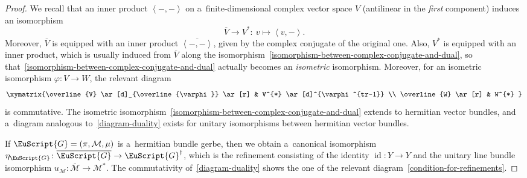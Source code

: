 \documentclass[pdftex]{sigma}
\numberwithin{equation}{section}
\def\mathscr#1{\EuScript{#1}}
\newcommand{\alxydim}[2]{\begin{aligned}\xymatrix#1{#2}\end{aligned}}
\newcommand{\id}{\operatorname{id}}
\begin{document}
\begin{proof}
We recall that an inner product $\left \langle -,- \right \rangle$ on a~finite-dimensional complex vector space $V$ (antilinear in the \emph{first} component) induces an isomorphism
\begin{equation}
\label{isomorphism-between-complex-conjugate-and-dual}
\overline{V} \to V^{*}\colon\ v \mapsto \left \langle v,- \right \rangle.
\end{equation}
Moreover, $\overline{V}$ is equipped with an inner product $\overline{\left \langle -,- \right \rangle}$, given by the complex conjugate of the original one. Also, $V^{*}$ is equipped with an inner product, which is usually induced from $\overline{V}$ along the isomorphism~\eqref{isomorphism-between-complex-conjugate-and-dual}, so that~\eqref{isomorphism-between-complex-conjugate-and-dual} actually becomes an \emph{isometric} isomorphism. Moreover, for an isometric isomorphism $\varphi\colon V \to W$, the relevant diagram
\begin{equation}
\label{diagram-duality}
\alxydim{}{\overline{V} \ar[d]_{\overline{\varphi}} \ar[r] & V^{*} \ar[d]^{\varphi^{tr-1}} \\ \overline{W} \ar[r] & W^{*} }
\end{equation}
is commutative. The isometric isomorphism~\eqref{isomorphism-between-complex-conjugate-and-dual} extends to hermitian vector bundles, and a~diagram analogous to~\eqref{diagram-duality} exists for unitary isomorphisms between hermitian vector bundles.


If $\mathscr{G}=(\pi,\mathcal{M},\mu)$ is a~hermitian bundle gerbe, then we obtain a~canonical isomorphism $\eta_{\mathscr{G}}\colon \overline{\mathscr{G}} \to \mathscr{G}^{\dagger}$, which is the refinement consisting of the identity $\id\colon Y \to Y$ and the unitary line bundle isomorphism $u_{\mathcal{M}}\colon \overline{\mathcal{M}} \to \mathcal{M}^{*}$. The commutativity of~\eqref{diagram-duality} shows the one of the relevant diagram~\eqref{condition-for-refinements}.


\end{proof}
\end{document}
